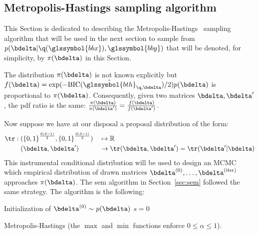 \subsection{Metropolis-Hastings sampling algorithm}

This Section is dedicated to describing the Metropolis-Hastings~\cite{hastings1970monte} sampling algorithm that will be used in the next section to sample from $p(\bdelta | \q(\glssymbol{bbx}),\glssymbol{bby})$ that will be denoted, for simplicity, by $\pi(\bdelta)$ in this Section.

The distribution $\pi(\bdelta)$ is not known explicitly but $f(\bdelta) = \exp(-\text{BIC}(\hat{\glssymbol{bth}}_{\q,\bdelta})/2) p(\bdelta)$ is proportional to $\pi(\bdelta)$. Consequently, given two matrices $\bdelta,\bdelta'$, the \gls{pdf} ratio is the same: $\frac{\pi(\bdelta)}{\pi(\bdelta')} = \frac{f(\bdelta)}{f(\bdelta')}$.

Now suppose we have at our disposal a proposal distribution of the form:
\begin{alignat}{2}
\tr: \; & ({\{0,1\}}^{\frac{d(d-1)}{2}},{\{0,1\}}^{\frac{d(d-1)}{2}}) && \mapsto \mathbb{R} \nonumber \\ 
& (\bdelta,\bdelta') && \to \tr(\bdelta,\bdelta') = \tr(\bdelta' | \bdelta) \nonumber
\end{alignat}
This instrumental conditional distribution will be used to design an MCMC which empirical distribution of drawn matrices $\bdelta^{(0)}, \dots, \bdelta^{(\text{iter})}$ approaches $\pi(\bdelta)$. The \gls{sem} algorithm in Section~\ref{sec:sem} followed the same strategy. The algorithm is the following:

\begin{algorithm}[H]
 Initialization of $ \bdelta^{(0)} \sim p(\bdelta)$\;
 $s = 0$\;
\caption{\label{metropolis} Metropolis-Hastings (the $\max$ and $\min$ functions enforce $0 \leq \alpha \leq 1$).}
\label{alg:metro}
\end{algorithm}

